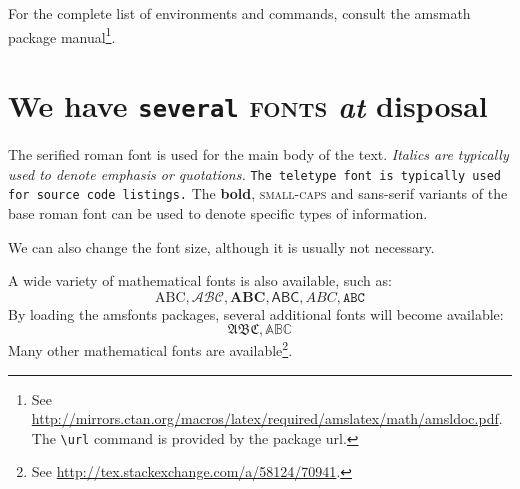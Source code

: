 \documentclass[
  digital, %
  oneside, %
  table,   %
  lof,     %
  lot,     %
]{fithesis3}
\begin{document}
For the complete list of environments and commands, consult the
\textsf{amsmath} package manual\footnote{
  See \url{http://mirrors.ctan.org/macros/latex/required/amslatex/math/amsldoc.pdf}.
  The \texttt{\textbackslash url} command is provided by the
  package \textsf{url}.
}.

\chapter{\textnormal{We \textsf{have} \texttt{several} \textsc{fonts}
  \textit{at} \textbf{disposal}}}
The serified roman font is used for the main body of the text.
\textit{Italics are typically used to denote emphasis or
quotations.} \texttt{The teletype font is typically used for source
code listings.} The \textbf{bold}, \textsc{small-caps} and
\textsf{sans-serif} variants of the base roman font can be used to
denote specific types of information.

\tiny We \scriptsize can \footnotesize also \small change \normalsize
the \large font \Large size, \LARGE although \huge it \Huge
is \huge usually \LARGE not \Large necessary.\normalsize

A wide variety of mathematical fonts is also available, such as: \[
  \mathrm{ABC}, \mathcal{ABC}, \mathbf{ABC}, \mathsf{ABC},
  \mathit{ABC}, \mathtt{ABC}
\] By loading the \textsf{amsfonts} packages, several additional
fonts will become available: \[
  \mathfrak{ABC}, \mathbb{ABC}
\] Many other mathematical fonts are available\footnote{
  See \url{http://tex.stackexchange.com/a/58124/70941}.
}.
\end{document}
